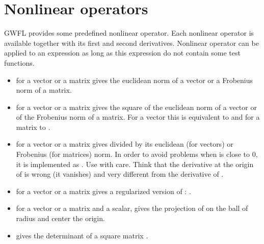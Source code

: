 \documentclass[a4paper,11pt,english]{sphinxmanual}
\begin{document}
\section{Nonlinear operators}
\label{\detokenize{userdoc/gasm_high:nonlinear-operators}}
GWFL provides some predefined nonlinear operator. Each nonlinear operator is available together with its first and second derivatives. Nonlinear operator can be applied to an expression as long as this expression do not contain some test functions.
\begin{itemize}
\item {} 
 for  a vector or a matrix gives the euclidean norm of a vector or a Frobenius norm of a matrix.

\item {} 
 for  a vector or a matrix gives the square of the euclidean norm of a vector or of the Frobenius norm of a matrix. For a vector this is equivalent to  and for a matrix to .

\item {} 
 for  a vector or a matrix gives  divided by its euclidean (for vectors) or Frobenius (for matrices) norm. In order to avoid problems when  is close to 0, it is implemented as . Use with care. Think that the derivative at the origin of  is wrong (it vanishes) and very different from the derivative of .

\item {} 
 for  a vector or a matrix gives a regularized version of  : .

\item {} 
 for  a vector or a matrix and  a scalar, gives the projection of  on the ball of radius  and center the origin.

\item {} 
 gives the determinant of a square matrix .


\end{itemize}
\end{document}
